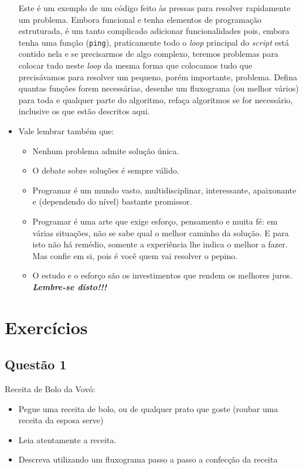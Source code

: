 \documentclass[a4paper, 12pt, onecolumn,singlespacing]{article}
\begin{document}
\begin{itemize}
Este é um exemplo de um código feito às pressas para resolver rapidamente um problema. Embora funcional e tenha elementos de programação estruturada, é um tanto complicado adicionar funcionalidades pois, embora tenha uma função (\texttt{ping}), praticamente todo o \textit{loop} principal do \textit{script} está contido nela e se precisarmos de algo complexo, teremos problemas para colocar tudo neste \textit{loop} da mesma forma que colocamos tudo que precisávamos para resolver um pequeno, porém importante, problema. Defina quantas funções forem necessárias, desenhe um fluxograma (ou melhor vários) para toda e qualquer parte do algoritmo, refaça algoritmos se for necessário, inclusive os que estão descritos aqui.
	\item Vale lembrar também que:
	\begin{itemize}
		\item Nenhum problema admite solução única.
		\item O debate sobre soluções é sempre válido.
		\item Programar é um mundo vasto, multidisciplinar, interessante, apaixonante e (dependendo do nível) bastante promissor.
		\item Programar é uma arte que exige esforço, pensamento e muita fé: em várias situações, não se sabe qual o melhor caminho da solução. E para isto não há remédio, somente a experiência lhe indica o melhor a fazer. Mas confie em si, pois é você quem vai resolver o pepino.
		\item O estudo e o esforço são os investimentos que rendem os melhores juros. \textbf{\textit{Lembre-se disto!!!}}
	\end{itemize}

\end{itemize}

\section{Exercícios}

\subsection{Questão 1}
	Receita de Bolo da Vovó:
	\begin{itemize}
		\item Pegue uma receita de bolo, ou de qualquer prato que goste (roubar uma receita da esposa serve)
		\item Leia atentamente a receita.
		\item Descreva utilizando um fluxograma passo a passo a confecção da receita
	\end{itemize}
\end{document}

